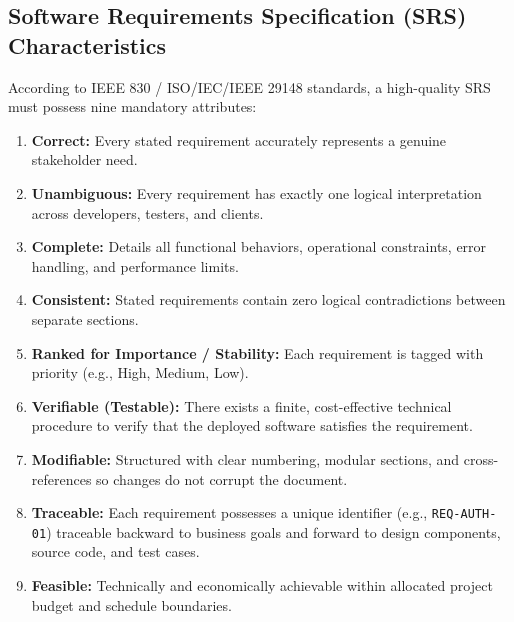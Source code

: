 \subsection{Software Requirements Specification (SRS) Characteristics}
According to IEEE 830 / ISO/IEC/IEEE 29148 standards, a high-quality SRS must possess nine mandatory attributes:
\begin{enumerate}
    \item \textbf{Correct:} Every stated requirement accurately represents a genuine stakeholder need.
    \item \textbf{Unambiguous:} Every requirement has exactly one logical interpretation across developers, testers, and clients.
    \item \textbf{Complete:} Details all functional behaviors, operational constraints, error handling, and performance limits.
    \item \textbf{Consistent:} Stated requirements contain zero logical contradictions between separate sections.
    \item \textbf{Ranked for Importance / Stability:} Each requirement is tagged with priority (e.g., High, Medium, Low).
    \item \textbf{Verifiable (Testable):} There exists a finite, cost-effective technical procedure to verify that the deployed software satisfies the requirement.
    \item \textbf{Modifiable:} Structured with clear numbering, modular sections, and cross-references so changes do not corrupt the document.
    \item \textbf{Traceable:} Each requirement possesses a unique identifier (e.g., \texttt{REQ-AUTH-01}) traceable backward to business goals and forward to design components, source code, and test cases.
    \item \textbf{Feasible:} Technically and economically achievable within allocated project budget and schedule boundaries.
\end{enumerate}

